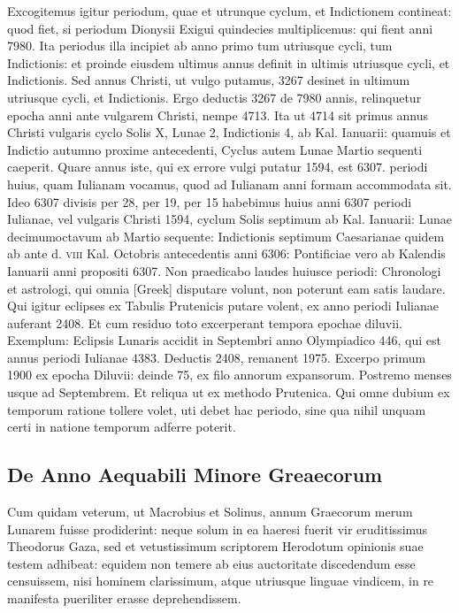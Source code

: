 Excogitemus igitur periodum,
quae et utrunque cyclum, et Indictionem contineat: quod fiet, si periodum
Dionysii Exigui quindecies multiplicemus: qui fient anni
7980.
Ita periodus illa incipiet ab anno primo tum utriusque cycli,
tum Indictionis: et proinde eiusdem ultimus annus definit in ultimis
utriusque cycli, et Indictionis.
Sed annus Christi, ut vulgo putamus,
3267 desinet in ultimum utriusque cycli, et Indictionis.
Ergo deductis
3267 de 7980 annis, relinquetur epocha anni ante vulgarem
Christi, nempe 4713.
Ita ut 4714 sit primus annus Christi vulgaris cyclo
Solis \textsc{X}, Lunae 2, Indictionis 4, ab Kal. Ianuarii: quamuis et Indictio
autumno proxime antecedenti, Cyclus autem Lunae Martio sequenti
caeperit.
Quare annus iste, qui ex errore vulgi putatur 1594, est 6307.
periodi huius, quam Iulianam vocamus, quod ad Iulianam anni formam
accommodata sit.
Ideo 6307 divisis per 28, per 19, per 15 habebimus
huius anni 6307 periodi Iulianae, vel vulgaris Christi 1594, cyclum
Solis septimum ab Kal. Ianuarii: Lunae decimumoctavum ab
Martio sequente: Indictionis septimum Caesarianae quidem ab ante d.
\textsc{viii} Kal. Octobris antecedentis anni 6306: Pontificiae vero ab
Kalendis Ianuarii anni propositi 6307.
Non praedicabo laudes huiusce periodi:
Chronologi et astrologi, qui omnia \textgreek{[Greek]} disputare volunt,
non poterunt eam satis laudare.
Qui igitur eclipses ex Tabulis
Prutenicis putare volent, ex anno periodi Iulianae auferant 2408.
Et
cum residuo toto excerperant tempora epochae diluvii.
Exemplum: Eclipsis
Lunaris accidit in Septembri anno Olympiadico 446, qui est annus
periodi Iulianae 4383.
Deductis 2408, remanent 1975.
Excerpo
primum 1900 ex epocha Diluvii: deinde 75, ex filo annorum expansorum.
Postremo menses usque ad Septembrem.
Et reliqua ut ex methodo
Prutenica.
Qui omne dubium ex temporum ratione tollere
volet, uti debet hac periodo, sine qua nihil unquam certi in natione
temporum adferre poterit.

\subsection{De Anno Aequabili Minore Greaecorum}
Cum quidam veterum, ut Macrobius et Solinus, annum Graecorum
merum Lunarem fuisse prodiderint: neque solum in ea
haeresi fuerit vir eruditissimus Theodorus Gaza, sed et vetustissimum
scriptorem Herodotum opinionis suae testem adhibeat: equidem non
temere ab eius auctoritate discedendum esse censuissem, nisi hominem
clarissimum, atque utriusque linguae vindicem, in re manifesta
pueriliter erasse deprehendissem.
